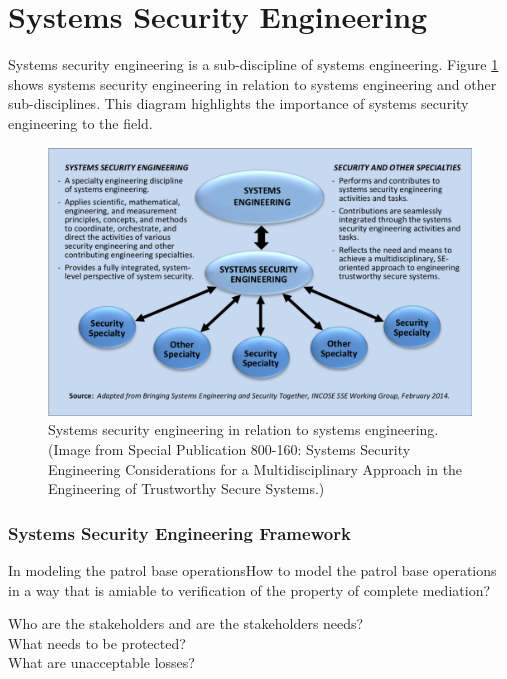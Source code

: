 \documentclass[../../main/main.tex]{subfiles}
\begin{document}
\section{Systems Security Engineering}\label{sec:sse}
Systems security engineering is a sub-discipline of systems engineering.  Figure \ref{fig:nist800160} shows systems security engineering in relation to systems engineering and other sub-disciplines.  This diagram highlights the importance of systems security engineering to the field. 

\begin{figure}[ht]
\includegraphics[width=\linewidth]{../figures/seincontext.png}
\caption{\label{fig:nist800160}Systems security engineering in relation to systems engineering. (Image from  Special Publication 800-160: Systems Security Engineering Considerations for a Multidisciplinary Approach in the Engineering of Trustworthy Secure Systems.)}
\end{figure}


\subsubsection{Systems Security Engineering Framework}\label{sssec:sseframework}


In modeling the patrol base operationsHow to model the patrol base operations in a way that is amiable to verification of the property of complete mediation?
\begin{description}
\item[Who are the stakeholders and are the stakeholders needs? ]
\item[What needs to be protected?] 
\item[What are unacceptable losses?]
\end{description}
\end{document}
